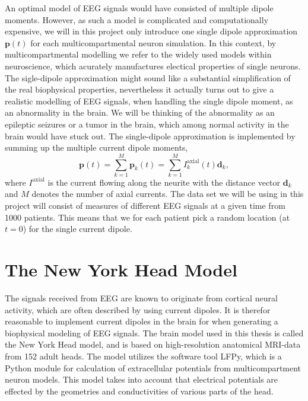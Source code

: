 \documentclass[a4paper, UKenglish, 11pt]{uiomaster}
\begin{document}
An optimal model of EEG signals would have consisted of multiple dipole moments. However, as such a model is complicated and computationally expensive, we will in this project only introduce one single dipole approximation $\textbf{p}(t)$ for each multicompartmental neuron simulation. In this context, by  multicompartmental modelling we refer to the widely used models within neuroscience, which acurately manufactures electical properties of single neurons. The sigle-dipole approximation might sound like a substantial simplification of the real biophysical properties, nevertheless it actually turns out to give a realistic modelling of EEG signals, when handling the single dipole moment, as an abnormality in the brain. We will be thinking of the abnormality as an epileptic seizures or a tumor in the brain, which among normal activity in the brain would have stuck out. The single-dipole approximation is implemented by summing up the multiple current dipole moments,
\begin{equation}
    \textbf{p}(t) = \sum_{k=1}^M \textbf{p}_k(t) = \sum_{k=1}^M I_k^{\text{axial}}(t)\textbf{d}_k,
\end{equation}
where $I^{\text{axial}}$ is the current flowing along the neurite with the distance vector $\textbf{d}_k$ and $M$ denotes the number of axial currents. The data set we will be using in this project will consist of measures of different EEG signals at a given time from 1000 patients. This means that we for each patient pick a random location (at $t=0$) for the single current dipole.

\section{The New York Head Model}
The signals received from EEG are known to originate from cortical neural activity, which are often described by using current dipoles. It is therefor reasonable to implement current dipoles in the brain for when generating a biophysical modeling of EEG signals. The brain model used in this thesis is called the New York Head model, and is based on high-resolution anatomical MRI-data from 152 adult heads. The model utilizes the software tool LFPy, which is a Python module for calculation of extracellular potentials from multicompartment neuron models. This model takes into account that electrical potentials are effected by the geometries and conductivities of various parts of the head.
\end{document}
